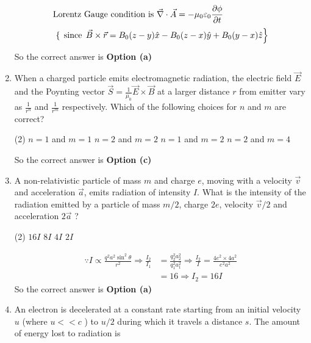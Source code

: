 \begin{enumerate}
\begin{answer}
\begin{align*}
	\text{Lorentz Gauge condition is }\vec{\nabla} \cdot \vec{A}&=-\mu_{0} \varepsilon_{0} \frac{\partial \phi}{\partial t}\\
	\intertext{	$\left\{\right.$ since $\left.\vec{B} \times \vec{r}=B_{0}(z-y) \hat{x}-B_{0}(z-x) \hat{y}+B_{0}(y-x) \hat{z}\right\}$}
	\end{align*}
	So the correct answer is \textbf{Option (a)}
\end{answer}
	\item  When a charged particle emits electromagnetic radiation, the electric field $\vec{E}$ and the Poynting vector $\vec{S}=\frac{1}{\mu_{0}} \vec{E} \times \vec{B}$ at a larger distance $r$ from emitter vary as $\frac{1}{r^{n}}$ and $\frac{1}{r^{m}}$ respectively. Which of the following choices for $n$ and $m$ are correct?
	{}
	\begin{tasks}(2)
		\task[\textbf{a.}]$n=1$ and $m=1$
		\task[\textbf{b.}] $n=2$ and $m=2$
		\task[\textbf{c.}]$n=1$ and $m=2$
		\task[\textbf{d.}] $n=2$ and $m=4$
	\end{tasks}
\begin{answer}
	So the correct answer is \textbf{Option (c)}
\end{answer}
	\item  A non-relativistic particle of mass $m$ and charge $e$, moving with a velocity $\vec{v}$ and acceleration $\vec{a}$, emits radiation of intensity $I$. What is the intensity of the radiation emitted by a particle of mass $m / 2$, charge $2 e$, velocity $\vec{v} / 2$ and acceleration $2 \vec{a}$ ?
	{}
	\begin{tasks}(2)
		\task[\textbf{a.}] $16 I$
		\task[\textbf{b.}]$8 I$
		\task[\textbf{c.}]$4 I$
		\task[\textbf{d.}] $2 I$
	\end{tasks}
\begin{answer}
	\begin{align*}
	\because I \propto \frac{q^{2} a^{2} \sin ^{2} \theta}{r^{2}} \Rightarrow \frac{I_{2}}{I_{1}}&=\frac{q_{2}^{2} a_{2}^{2}}{q_{1}^{2} a_{1}^{2}} \Rightarrow \frac{I_{2}}{I}=\frac{4 e^{2} \times 4 a^{2}}{e^{2} a^{2}}\\&=16 \Rightarrow I_{2}=16 I
	\end{align*}
	So the correct answer is \textbf{Option (a)}
\end{answer}
	\item  An electron is decelerated at a constant rate starting from an initial velocity $u$ (where $u<<c$ ) to $u / 2$ during which it travels a distance $s$. The amount of energy lost to radiation is

\end{enumerate}
